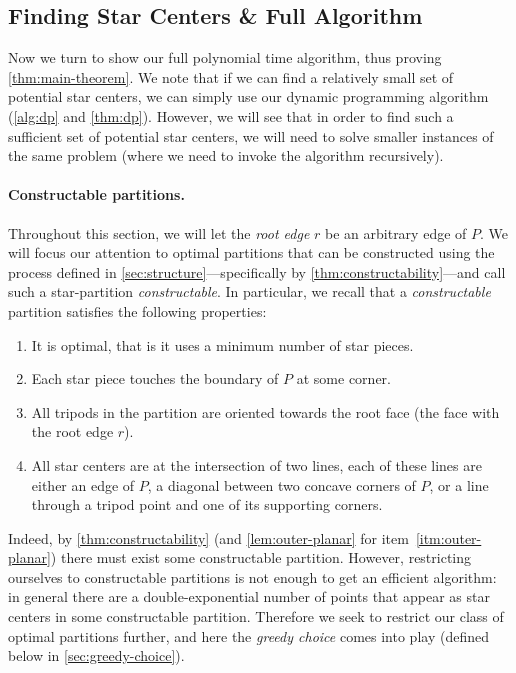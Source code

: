 \documentclass{theoretics}
\begin{document}
\subsection{Finding Star Centers \& Full Algorithm}
\label{sec:full-algo}

Now we turn to show our full polynomial time algorithm, thus proving \cref{thm:main-theorem}. We note that if we can find a relatively small set of potential star centers, we can simply use our dynamic programming algorithm (\cref{alg:dp} and \cref{thm:dp}). However, we will see that in order to find such a sufficient set of potential star centers, we will need to solve smaller instances of the same problem (where we need to invoke the algorithm recursively).


\paragraph{Constructable partitions.}
Throughout this section, we will let the \emph{root edge} $r$ be an arbitrary edge of $P$. We will focus our attention to optimal partitions that can be constructed using the process defined in \cref{sec:structure}---specifically by \cref{thm:constructability}---and call such a star-partition \emph{constructable}. In particular, we recall that a \emph{constructable} partition satisfies the following properties:
\begin{enumerate}[label=(\roman*)]
    \item\label{itm:consti} It is optimal, that is it uses a minimum number of star pieces.
    \item\label{itm:outer-planar} Each star piece touches the boundary of $P$ at some corner.
    \item All tripods in the partition are oriented towards the root face (the face with the root edge $r$).
    \item\label{itm:constiv} All star centers are at the intersection of two lines, each of these lines are either an edge of $P$, a diagonal between two concave corners of $P$, or a line through a tripod point and one of its supporting corners. 
\end{enumerate}
Indeed, by \cref{thm:constructability} (and \cref{lem:outer-planar} for item~\ref{itm:outer-planar}) there must exist some constructable partition. However, restricting ourselves to constructable partitions is not enough to get an efficient algorithm: in general there are a double-exponential number of points that appear as star centers in some constructable partition. Therefore we seek to restrict our class of optimal partitions further, and here the \emph{greedy choice} comes into play (defined below in \cref{sec:greedy-choice}).
\end{document}
